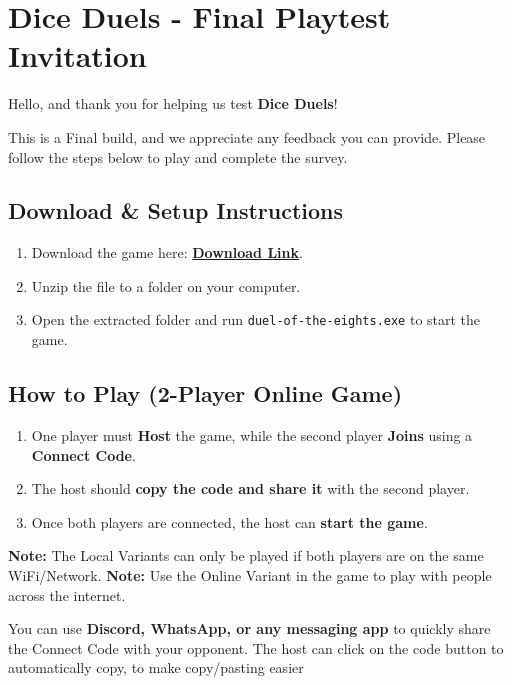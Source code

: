 \documentclass[12pt, titlepage]{article}
\begin{document}
\newpage

\section{Dice Duels - Final Playtest Invitation}

Hello, and thank you for helping us test \textbf{Dice Duels}!

This is a Final build, and we appreciate any feedback you can provide. Please follow the steps below to play and complete the survey.

\subsection{Download \& Setup Instructions}
\begin{enumerate}
    \item Download the game here: \href{https://drive.google.com/file/d/1d3nVYBTYOlCqEDQzMCE7T-mupDVaDM37/view?usp=sharing}{\textbf{Download Link}}.
    \item Unzip the file to a folder on your computer.
    \item Open the extracted folder and run \texttt{duel-of-the-eights.exe} to start the game.
\end{enumerate}

\subsection{How to Play (2-Player Online Game)}
\begin{enumerate}
    \item One player must \textbf{Host} the game, while the second player \textbf{Joins} using a \textbf{Connect Code}.
    \item The host should \textbf{copy the code and share it} with the second player.
    \item Once both players are connected, the host can \textbf{start the game}.
\end{enumerate}

\textbf{Note:} The Local Variants can only be played if both players are on the same WiFi/Network.
\textbf{Note:} Use the Online Variant in the game to play with people across the internet.

\begin{tcolorbox}[colback=gray!10, colframe=black, title=Tip]
You can use \textbf{Discord, WhatsApp, or any messaging app} to quickly share the Connect Code with your opponent.
The host can click on the code button to automatically copy, to make copy/pasting easier
\end{tcolorbox}
\end{document}
